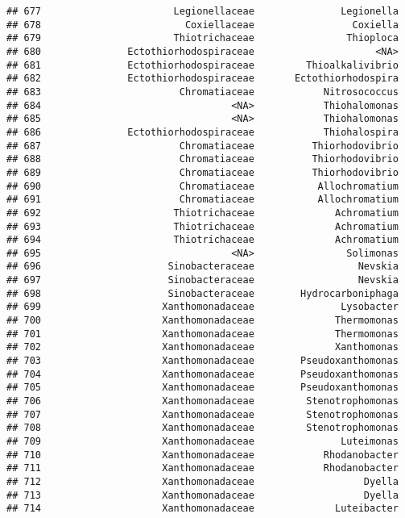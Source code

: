 \documentclass[
]{article}
\begin{document}
\begin{verbatim}
## 677                       Legionellaceae               Legionella
## 678                         Coxiellaceae                 Coxiella
## 679                       Thiotrichaceae                Thioploca
## 680               Ectothiorhodospiraceae                     <NA>
## 681               Ectothiorhodospiraceae         Thioalkalivibrio
## 682               Ectothiorhodospiraceae       Ectothiorhodospira
## 683                        Chromatiaceae            Nitrosococcus
## 684                                 <NA>            Thiohalomonas
## 685                                 <NA>            Thiohalomonas
## 686               Ectothiorhodospiraceae            Thiohalospira
## 687                        Chromatiaceae          Thiorhodovibrio
## 688                        Chromatiaceae          Thiorhodovibrio
## 689                        Chromatiaceae          Thiorhodovibrio
## 690                        Chromatiaceae           Allochromatium
## 691                        Chromatiaceae           Allochromatium
## 692                       Thiotrichaceae              Achromatium
## 693                       Thiotrichaceae              Achromatium
## 694                       Thiotrichaceae              Achromatium
## 695                                 <NA>                Solimonas
## 696                      Sinobacteraceae                  Nevskia
## 697                      Sinobacteraceae                  Nevskia
## 698                      Sinobacteraceae        Hydrocarboniphaga
## 699                     Xanthomonadaceae               Lysobacter
## 700                     Xanthomonadaceae              Thermomonas
## 701                     Xanthomonadaceae              Thermomonas
## 702                     Xanthomonadaceae              Xanthomonas
## 703                     Xanthomonadaceae        Pseudoxanthomonas
## 704                     Xanthomonadaceae        Pseudoxanthomonas
## 705                     Xanthomonadaceae        Pseudoxanthomonas
## 706                     Xanthomonadaceae         Stenotrophomonas
## 707                     Xanthomonadaceae         Stenotrophomonas
## 708                     Xanthomonadaceae         Stenotrophomonas
## 709                     Xanthomonadaceae               Luteimonas
## 710                     Xanthomonadaceae            Rhodanobacter
## 711                     Xanthomonadaceae            Rhodanobacter
## 712                     Xanthomonadaceae                   Dyella
## 713                     Xanthomonadaceae                   Dyella
## 714                     Xanthomonadaceae              Luteibacter

\end{verbatim}
\end{document}
